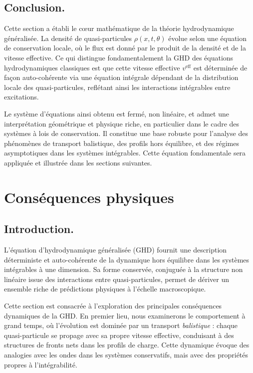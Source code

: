 \subsection*{Conclusion.}
Cette section a établi le cœur mathématique de la théorie hydrodynamique généralisée. La densité de quasi-particules $\rho(x,t,\theta)$ évolue selon une équation de conservation locale, où le flux est donné par le produit de la densité et de la vitesse effective. Ce qui distingue fondamentalement la GHD des équations hydrodynamiques classiques est que cette vitesse effective $v^{\mathrm{eff}}$ est déterminée de façon auto-cohérente via une équation intégrale dépendant de la distribution locale des quasi-particules, reflétant ainsi les interactions intégrables entre excitations.

Le système d’équations ainsi obtenu est fermé, non linéaire, et admet une interprétation géométrique et physique riche, en particulier dans le cadre des systèmes à lois de conservation. Il constitue une base robuste pour l’analyse des phénomènes de transport balistique, des profils hors équilibre, et des régimes asymptotiques dans les systèmes intégrables. Cette équation fondamentale sera appliquée et illustrée dans les sections suivantes.

\section{Conséquences physiques}

\subsection*{Introduction.}
L’équation d’hydrodynamique généralisée (GHD) fournit une description déterministe et auto-cohérente de la dynamique hors équilibre dans les systèmes intégrables à une dimension. Sa forme conservée, conjuguée à la structure non linéaire issue des interactions entre quasi-particules, permet de dériver un ensemble riche de prédictions physiques à l’échelle macroscopique.

Cette section est consacrée à l’exploration des principales conséquences dynamiques de la GHD. En premier lieu, nous examinerons le comportement à grand temps, où l’évolution est dominée par un transport \emph{balistique} : chaque quasi-particule se propage avec sa propre vitesse effective, conduisant à des structures de fronts nets dans les profils de charge. Cette dynamique évoque des analogies avec les ondes dans les systèmes conservatifs, mais avec des propriétés propres à l’intégrabilité.


